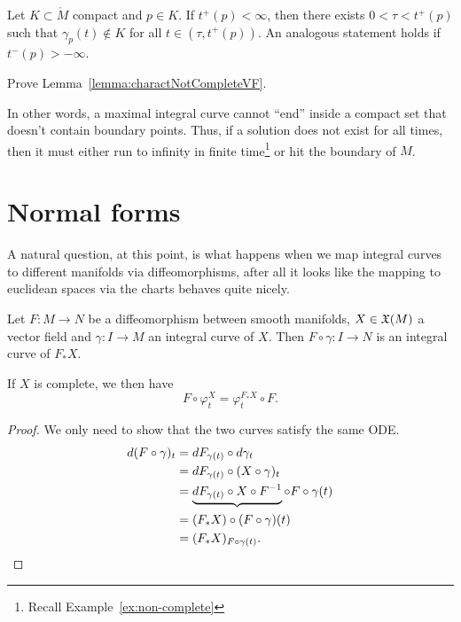 \begin{lemma}\label{lemma:charactNotCompleteVF}
  Let $K\subset \mathring M$ compact and $p\in K$.
  If $t^+(p) < \infty$, then there exists $0<\tau<t^+(p)$ such that $\gamma_p(t)\not\in K$ for all $t\in (\tau, t^+(p))$.
  An analogous statement holds if $t^-(p) > -\infty$.
\end{lemma}

\begin{exercise}
  Prove Lemma~\ref{lemma:charactNotCompleteVF}.
\end{exercise}

In other words, a maximal integral curve cannot ``end'' inside a compact set that doesn't contain boundary points.
Thus, if a solution does not exist for all times, then it must either run to infinity in finite time\footnote{Recall Example~\ref{ex:non-complete}} or hit the boundary of $M$.

\section{Normal forms}

A natural question, at this point, is what happens when we map integral curves to different manifolds via diffeomorphisms, after all it looks like the mapping to euclidean spaces via the charts behaves quite nicely.

\begin{proposition}\label{prop:conjpfX}
  Let $F: M \to N$ be a diffeomorphism between smooth manifolds, $X\in\mathfrak{X}(M)$ a vector field and $\gamma:I\to M$ an integral curve of $X$. Then $F\circ\gamma : I \to N$ is an integral curve of $F_* X$.

  If $X$ is complete, we then have
  \begin{equation}
    F\circ\varphi_t^X = \varphi_t^{F_* X}\circ F.
  \end{equation}
\end{proposition}
\begin{proof}
  We only need to show that the two curves satisfy the same ODE.
  \begin{align*}
    d(F\circ \gamma)_t 
    &= dF_{\gamma(t)} \circ d\gamma_t \\
    &= dF_{\gamma(t)} \circ (X \circ \gamma)_t \\
    &= \LaTeXunderbrace{dF_{\gamma(t)} \circ X \circ F^{-1}} \circ F \circ \gamma(t) \\
    &= (F_* X) \circ (F\circ \gamma)(t) \\
    &= (F_* X)_{F\circ\gamma(t)}.
  \end{align*}
\end{proof}

